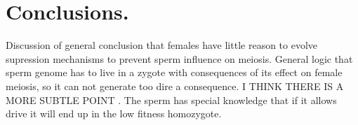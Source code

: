 \documentclass[12pt,letterpaper]{article}
\begin{document}
\section*{Conclusions.}
Discussion of general conclusion that females have little reason to evolve supression mechanisms to prevent sperm influence on meiosis. 
General logic that sperm genome has to live in a zygote with consequences of its effect on female meiosis, so
it can not generate too dire a consequence.
I THINK THERE IS A MORE SUBTLE POINT . The sperm has special knowledge
that if it allows drive it will end up in the low fitness homozygote. 


\end{document}
